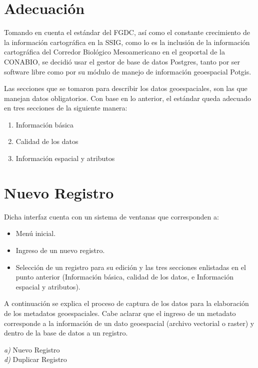 \documentclass[twoside]{book}
\begin{document}
\section{Adecuación}

Tomando en cuenta el estándar del FGDC, así como el constante crecimiento de la información cartográfica en la SSIG, como lo es la inclusión de la información cartográfica del Corredor Biológico Mesoamericano en el geoportal de la CONABIO, se decidió usar el gestor de base de datos Postgres, tanto por ser software libre como por su módulo de manejo de información geoespacial Potgis.

Las secciones que se tomaron para describir los datos geoespaciales, son las que manejan datos obligatorios. Con base en lo anterior, el estándar queda adecuado en tres secciones de la siguiente manera:
\begin{enumerate}
\item Información básica
\item Calidad de los datos
\item Información espacial y atributos
\end{enumerate}
	
\section{Nuevo Registro}

Dicha interfaz cuenta con un sistema de ventanas que corresponden a: 

\begin{itemize}
	\item Menú inicial.
	\item Ingreso de un nuevo registro.
	\item Selección de  un registro para su edición y las tres secciones enlistadas en el punto anterior (Información básica,  calidad de los datos, e Información espacial y atributos).
\end{itemize}

A continuación se explica el proceso de captura de los datos para la elaboración de los metadatos geoespaciales. Cabe aclarar que el ingreso de un metadato corresponde a la información de un dato geoespacial (archivo vectorial o raster) y dentro de la base de datos a un registro. 

\textit{a)} Nuevo Registro\\
\textit {d)} Duplicar Registro
\end{document}
